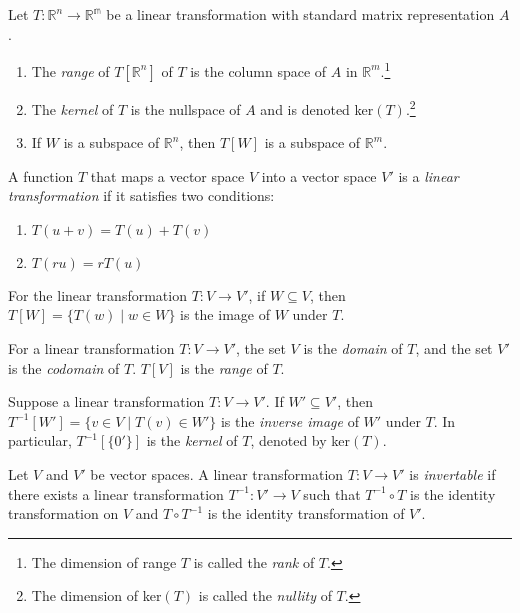 \documentclass[nobib,notoc]{tufte-handout}
\begin{document}
Let \(T:\mathbb{R}^n\rightarrow\mathbb{R^m}\) be a linear transformation with standard matrix representation \(A\).
\begin{enumerate}
	\item The \emph{range} of \(T[\mathbb{R}^n]\) of \(T\) is the column space of \(A\) in \(\mathbb{R}^m\).\footnote{The dimension of range \(T\) is called the \emph{rank} of \(T\).}
	\item The \emph{kernel} of \(T\) is the nullspace of \(A\) and is denoted ker\((T)\).\footnote{The dimension of ker\((T)\) is called the \emph{nullity} of \(T\).}
	\item If \(W\) is a subspace of \(\mathbb{R}^n\), then \(T[W]\) is a subspace of \(\mathbb{R}^m\).
\end{enumerate}
\begin{defi}
	A function \(T\) that maps a vector space \(V\) into a vector space \(V'\) is a \emph{linear transformation} if it satisfies two conditions:
\begin{enumerate}
	\item \(T(u+v)=T(u)+T(v)\)
	\item \(T(ru)=rT(u)\)
\end{enumerate}
\end{defi}
\begin{defi}[Image]
	For the linear transformation \(T:V\rightarrow V'\), if \(W\subseteq V\), then \(T[W]=\{T(w)\mid w\in W\}\) is the image of \(W\) under \(T\).
\end{defi}
\begin{defi}
	For a linear transformation \(T:V\rightarrow V'\), the set \(V\) is the \emph{domain} of \(T\), and the set \(V'\) is the \emph{codomain} of \(T\). \(T[V]\) is the \emph{range} of \(T\).
\end{defi}
\begin{defi}
	Suppose a linear transformation \(T:V\rightarrow V'\). If \(W'\subseteq V'\), then \(T^{-1}[W']=\{v\in V\mid T(v)\in W'\}\) is the \emph{inverse image} of \(W'\) under \(T\). In particular, \(T^{-1}[\{0'\}]\) is the \emph{kernel} of \(T\), denoted by ker\((T)\).
\end{defi}
\begin{defi}
	Let \(V\) and \(V'\) be vector spaces. A linear transformation \(T:V\rightarrow V'\) is \emph{invertable} if there exists a linear transformation \(T^{-1}:V'\rightarrow V\) such that \(T^{-1}\circ T\) is the identity transformation on \(V\) and \(T\circ T^{-1}\) is the identity transformation of \(V'\).
\end{defi}
\end{document}
